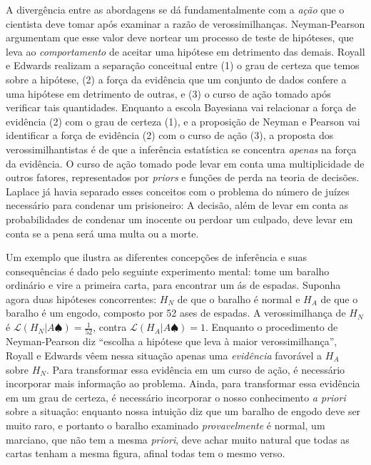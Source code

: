 A divergência entre as abordagens se dá fundamentalmente com a {\em ação} que o cientista deve tomar após examinar a 
razão de verossimilhanças. Neyman-Pearson argumentam que esse valor deve nortear um processo de teste de hipóteses, que
leva ao {\em comportamento} de aceitar uma hipótese em detrimento das demais. Royall e Edwards realizam a separação
conceitual entre (1) o grau de certeza que temos sobre a hipótese, (2) a força da evidência que um conjunto de dados confere
a uma hipótese em detrimento de outras, e (3) o curso de ação tomado após verificar tais quantidades. Enquanto a escola
Bayesiana vai relacionar a força de evidência (2) com o grau de certeza (1), e a proposição de Neyman e Pearson vai 
identificar a força de evidência (2) com o curso de ação (3), a proposta dos verossimilhantistas é de que a inferência
estatística se concentra {\em apenas} na força da evidência. O curso de ação tomado
pode levar em conta uma multiplicidade de outros fatores, representados por {\em priors} e funções de perda na teoria de 
decisões. Laplace já havia separado esses conceitos com o problema do 
número de juízes necessário para condenar um prisioneiro: A decisão, além de levar em conta as probabilidades de
condenar um inocente ou perdoar um culpado, deve levar em conta se a
pena será uma multa ou a morte.

Um exemplo que ilustra as diferentes concepções de inferência e suas consequências é dado pelo seguinte experimento
mental: tome um baralho ordinário e vire a primeira carta,
para encontrar um ás de espadas. Suponha agora duas hipóteses concorrentes: $H_N$ de que o baralho é normal e $H_A$
de que o baralho é um engodo, composto por 52 ases de espadas. A verossimilhança de $H_N$ é 
$\mathcal{L} (H_N|A \spadesuit) = \frac{1}{52}$, contra $\mathcal{L} (H_A | A \spadesuit) = 1 $. Enquanto o procedimento
de Neyman-Pearson diz ``escolha a hipótese que leva à maior verossimilhança'', Royall e Edwards vêem nessa situação
apenas uma {\em evidência} favorável a $H_A$ sobre $H_N$. Para transformar essa evidência em um curso de ação, é necessário
incorporar mais informação ao problema. 
Ainda, para transformar essa evidência em um grau de certeza,
é necessário incorporar o nosso conhecimento {\em a priori} sobre a situação: enquanto nossa intuição diz
que um baralho de engodo deve ser muito raro, e portanto o baralho examinado {\em provavelmente} é normal, um marciano,
que não tem a mesma {\em priori}, deve achar muito natural que todas as cartas tenham a mesma figura, afinal todas tem o mesmo
verso. 

